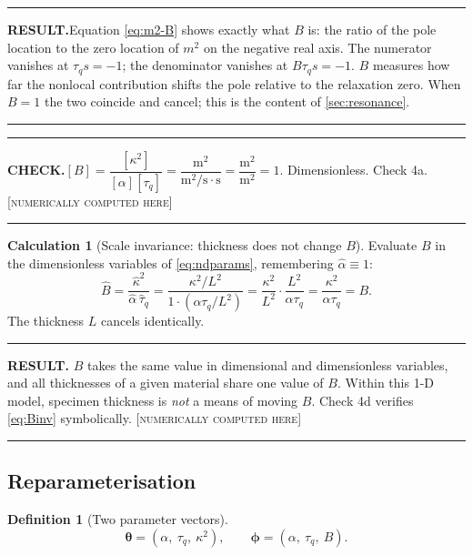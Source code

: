 \documentclass[11pt,a4paper]{article}
\theoremstyle{definition}
\newtheorem{definitionx}{Definition}[section]
\newtheorem{calculationx}{Calculation}[section]
\newenvironment{checkbox}%
  {\par\medskip\noindent\begin{minipage}{\linewidth}%
   \rule{\linewidth}{0.4pt}\par\noindent\textbf{CHECK.}\enspace}%
  {\par\rule{\linewidth}{0.4pt}\end{minipage}\par\medskip}
\newenvironment{resultbox}%
  {\par\medskip\noindent\begin{minipage}{\linewidth}%
   \rule{\linewidth}{1.0pt}\par\noindent\textbf{RESULT.}\enspace}%
  {\par\rule{\linewidth}{1.0pt}\end{minipage}\par\medskip}
\newcommand{\NUM}{\textcolor{red!55!black}{\footnotesize[\textsc{numerically computed here}]}}
\newcommand{\tq}{\tau_{q}}
\newcommand{\kk}{\kappa^{2}}
\newcommand{\Bnum}{B}
\begin{document}
\begin{resultbox}[Mathematical meaning of $\Bnum$]
Equation \eqref{eq:m2-B} shows exactly what $\Bnum$ is: the ratio of the pole
location to the zero location of $m^{2}$ on the negative real axis. The
numerator vanishes at $\tq s=-1$; the denominator vanishes at
$\Bnum\tq s=-1$. $\Bnum$ measures how far the nonlocal contribution shifts the
pole relative to the relaxation zero. When $\Bnum=1$ the two coincide and
cancel; this is the content of \cref{sec:resonance}.
\end{resultbox}

\begin{checkbox}[Dimensions]
$[\Bnum]=\dfrac{[\kk]}{[\alpha][\tq]}
 =\dfrac{\si{\metre\squared}}
        {\si{\metre\squared\per\second}\cdot\si{\second}}
 =\dfrac{\si{\metre\squared}}{\si{\metre\squared}}=1$.
Dimensionless. Check 4a. \NUM
\end{checkbox}

\begin{calculationx}[Scale invariance: thickness does not change $\Bnum$]
\label{calc:Binv}
Evaluate $\Bnum$ in the dimensionless variables of \eqref{eq:ndparams},
remembering $\hat\alpha\equiv1$:
\begin{equation}
  \hat\Bnum
   = \frac{\hat\kappa^{2}}{\hat\alpha\,\hat\tau_{q}}
   = \frac{\kk/L^{2}}{1\cdot\left(\alpha\tq/L^{2}\right)}
   = \frac{\kk}{L^{2}}\cdot\frac{L^{2}}{\alpha\tq}
   = \frac{\kk}{\alpha\tq}
   = \Bnum .
  \label{eq:Binv}
\end{equation}
The thickness $L$ cancels identically.
\end{calculationx}

\begin{resultbox}
$\Bnum$ takes the same value in dimensional and dimensionless variables, and
all thicknesses of a given material share one value of $\Bnum$. Within this
1-D model, specimen thickness is \emph{not} a means of moving $\Bnum$.
Check 4d verifies \eqref{eq:Binv} symbolically. \NUM
\end{resultbox}

\subsection{Reparameterisation}
\label{sec:reparam-def}

\begin{definitionx}[Two parameter vectors]
\label{def:twovectors}
\begin{equation}
  \bm{\theta}=(\alpha,\ \tq,\ \kk) ,
  \qquad
  \bm{\phi}=(\alpha,\ \tq,\ \Bnum) .
  \label{eq:phi-def}
\end{equation}
\end{definitionx}
\end{document}
